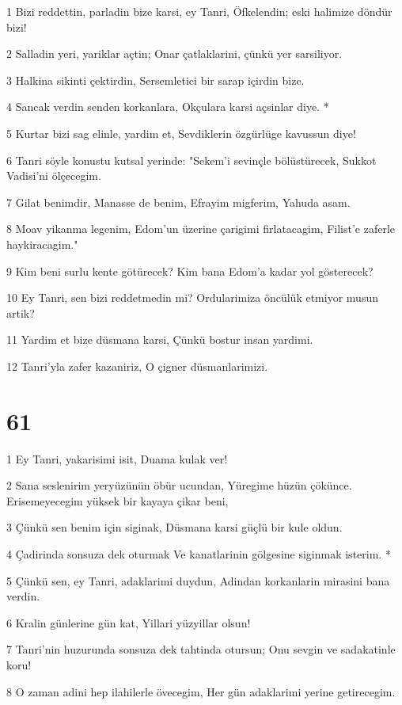 \par 1 Bizi reddettin, parladin bize karsi, ey Tanri, Öfkelendin; eski halimize döndür bizi!
\par 2 Salladin yeri, yariklar açtin; Onar çatlaklarini, çünkü yer sarsiliyor.
\par 3 Halkina sikinti çektirdin, Sersemletici bir sarap içirdin bize.
\par 4 Sancak verdin senden korkanlara, Okçulara karsi açsinlar diye. *
\par 5 Kurtar bizi sag elinle, yardim et, Sevdiklerin özgürlüge kavussun diye!
\par 6 Tanri söyle konustu kutsal yerinde: "Sekem'i sevinçle bölüstürecek, Sukkot Vadisi'ni ölçecegim.
\par 7 Gilat benimdir, Manasse de benim, Efrayim migferim, Yahuda asam.
\par 8 Moav yikanma legenim, Edom'un üzerine çarigimi firlatacagim, Filist'e zaferle haykiracagim."
\par 9 Kim beni surlu kente götürecek? Kim bana Edom'a kadar yol gösterecek?
\par 10 Ey Tanri, sen bizi reddetmedin mi? Ordularimiza öncülük etmiyor musun artik?
\par 11 Yardim et bize düsmana karsi, Çünkü bostur insan yardimi.
\par 12 Tanri'yla zafer kazaniriz, O çigner düsmanlarimizi.

\chapter{61}

\par 1 Ey Tanri, yakarisimi isit, Duama kulak ver!
\par 2 Sana seslenirim yeryüzünün öbür ucundan, Yüregime hüzün çökünce. Erisemeyecegim yüksek bir kayaya çikar beni,
\par 3 Çünkü sen benim için siginak, Düsmana karsi güçlü bir kule oldun.
\par 4 Çadirinda sonsuza dek oturmak Ve kanatlarinin gölgesine siginmak isterim. *
\par 5 Çünkü sen, ey Tanri, adaklarimi duydun, Adindan korkanlarin mirasini bana verdin.
\par 6 Kralin günlerine gün kat, Yillari yüzyillar olsun!
\par 7 Tanri'nin huzurunda sonsuza dek tahtinda otursun; Onu sevgin ve sadakatinle koru!
\par 8 O zaman adini hep ilahilerle övecegim, Her gün adaklarimi yerine getirecegim.

